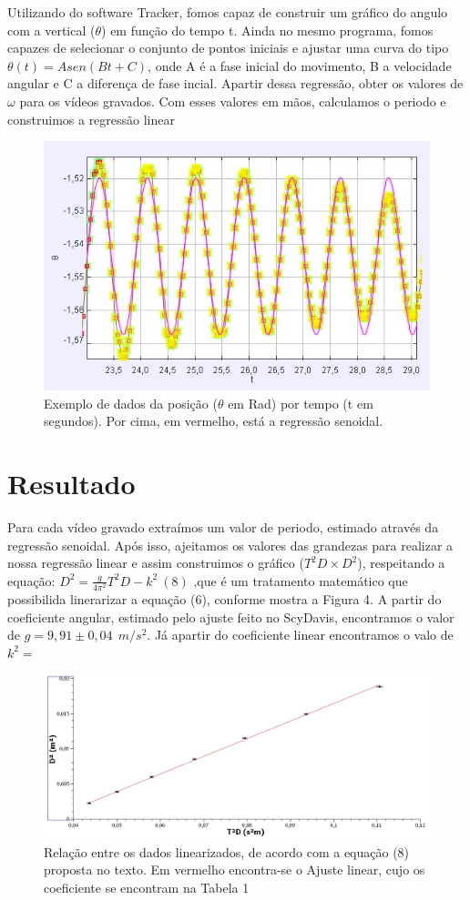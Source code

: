 \documentclass[hidelinks,a4paper,12pt]{article}
\begin{document}
\qquad Utilizando do software Tracker, fomos capaz de construir um gráfico do angulo com a vertical ($\theta$) em função do tempo t. 
Ainda no mesmo programa, fomos capazes de selecionar o conjunto de pontos iniciais e ajustar uma curva do tipo $\theta (t) = Asen (Bt + C)$, onde A é a fase inicial do movimento, B a velocidade angular
e C a diferença de fase incial. Apartir dessa regressão, obter os valores de $\omega$ 
para os vídeos gravados. Com esses valores em mãos, calculamos o periodo e construimos a regressão linear
\begin{figure}[h]
    \centering
    \includegraphics[width=0.7\linewidth]{grafico3.png}
    \caption{\small{Exemplo de dados da posição ($\theta$ em Rad) por tempo (t em segundos). Por cima, em vermelho, está a regressão senoidal.}}
    \label{fig:1.4}
\end{figure}

\section*{Resultado}
\qquad Para cada vídeo gravado extraímos um valor de periodo, estimado 
através da regressão senoidal. Após isso, ajeitamos os valores das grandezas para realizar 
a nossa regressão linear e assim construimos o gráfico ($T^2D \times D^2$), respeitando a 
equação: $D^2 = \frac{g}{4\pi^2}T^2D - k^2 \ (8) $ ,que é um tratamento matemático que possibilida linerarizar a equação (6), conforme mostra a Figura 4.
 A partir do coeficiente angular, estimado pelo ajuste feito no ScyDavis, encontramos o valor de $\boxed{g = 9,91 \pm 0,04 \ \ m/s^2}$. Já apartir do coeficiente linear encontramos o valo de $\boxed{k^2 = }$
\begin{figure}[h]
    \centering
    \includegraphics[width=1\linewidth]{grafico4.png}
    \caption{\small{Relação entre os dados linearizados, de acordo com a equação (8) proposta no texto. Em vermelho encontra-se o Ajuste linear, cujo os coeficiente se encontram na Tabela 1
    }}
    \label{fig:1.4}
\end{figure}
\end{document}
